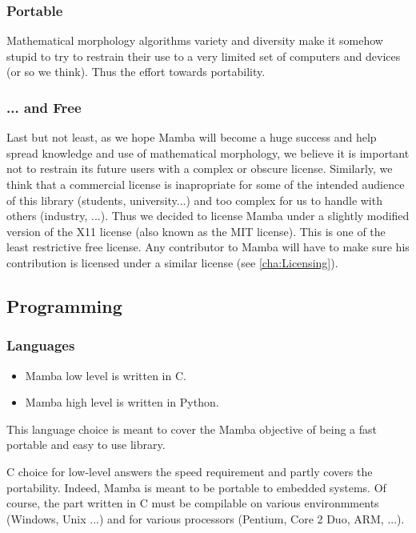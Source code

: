 \documentclass[a4paper,10pt,oneside]{article}
\begin{document}
\subsubsection{Portable}

Mathematical morphology algorithms variety and diversity make it somehow
stupid to try to restrain their use to a very limited set of computers
and devices (or so we think). Thus the effort towards portability.


\subsubsection{... and Free}

Last but not least, as we hope Mamba will become a huge success and
help spread knowledge and use of mathematical morphology, we believe
it is important not to restrain its future users with a complex or
obscure license. Similarly, we think that a commercial license is inapropriate
for some of the intended audience of this library (students, university...)
and too complex for us to handle with others (industry, ...). Thus
we decided to license Mamba under a slightly modified version of the
X11 license (also known as the MIT license). This is one of the least
restrictive free license. Any contributor to Mamba will have to make
sure his contribution is licensed under a similar license (see \ref{cha:Licensing}).

\subsection{Programming}

\subsubsection{Languages}
\begin{itemize}
\item Mamba low level is written in C. 
\item Mamba high level is written in Python. 
\end{itemize}
This language choice is meant to cover the Mamba objective of being
a fast portable and easy to use library.

C choice for low-level answers the speed requirement and partly covers
the portability. Indeed, Mamba is meant to be portable to embedded
systems. Of course, the part written in C must be compilable on various
environmments (Windows, Unix ...) and for various processors (Pentium,
Core 2 Duo, ARM, ...).
\end{document}

